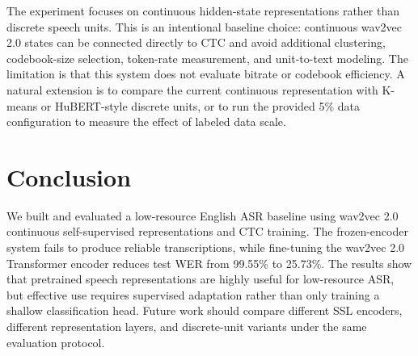 \documentclass{article}
\begin{document}
The experiment focuses on continuous hidden-state representations rather than discrete speech units. This is an intentional baseline choice: continuous wav2vec 2.0 states can be connected directly to CTC and avoid additional clustering, codebook-size selection, token-rate measurement, and unit-to-text modeling. The limitation is that this system does not evaluate bitrate or codebook efficiency. A natural extension is to compare the current continuous representation with K-means or HuBERT-style discrete units, or to run the provided 5\% data configuration to measure the effect of labeled data scale.

\section{Conclusion}
\label{sec:conclusion}

We built and evaluated a low-resource English ASR baseline using wav2vec 2.0 continuous self-supervised representations and CTC training. The frozen-encoder system fails to produce reliable transcriptions, while fine-tuning the wav2vec 2.0 Transformer encoder reduces test WER from 99.55\% to 25.73\%. The results show that pretrained speech representations are highly useful for low-resource ASR, but effective use requires supervised adaptation rather than only training a shallow classification head. Future work should compare different SSL encoders, different representation layers, and discrete-unit variants under the same evaluation protocol.



\end{document}
